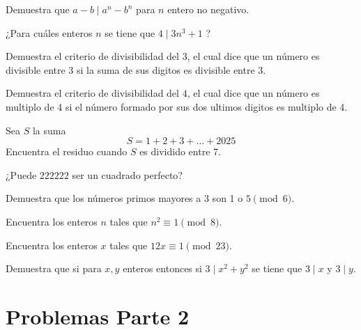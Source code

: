 \documentclass[11pt]{scrartcl}
\begin{document}
\begin{problem}
Demuestra que $a-b \mid a^n-b^n$ para $n$ entero no negativo. 
\end{problem}

\begin{problem}
¿Para cu\'ales enteros $n$ se tiene que $4 \mid 3n^3+1$ ?
\end{problem}

\begin{problem}
Demuestra el criterio de divisibilidad del 3, el cual dice que un n\'umero es divisible entre 3 si la suma de sus digitos es divisible entre 3.
\end{problem}

\begin{problem}
Demuestra el criterio de divisibilidad del $4$, el cual dice que un n\'umero es multiplo de 4 si el n\'umero formado por sus dos ultimos digitos es multiplo de 4.
\end{problem}


\begin{problem}
Sea $S$ la suma 
\[S=1+2+3+\ldots+2025\]
Encuentra el residuo cuando $S$ es dividido entre 7.
\end{problem}



\begin{problem}
¿Puede $222222$ ser un cuadrado perfecto?
\end{problem}

\begin{problem}
Demuestra que los n\'umeros primos mayores a 3 son 1 o $5 \pmod 6$. 
\end{problem}


\begin{problem}
Encuentra los enteros $n$ tales que $n^2 \equiv 1 \pmod 8$.
\end{problem}

\begin{problem}
Encuentra los enteros $x$ tales que $12x \equiv 1 \pmod{23}$.
\end{problem}

\begin{problem}
Demuestra que si para $x,y$ enteros entonces si $3\mid x^2+y^2$ se tiene que $3\mid x$ y $3\mid y$. 
\end{problem}

\section{Problemas Parte 2}
\end{document}
